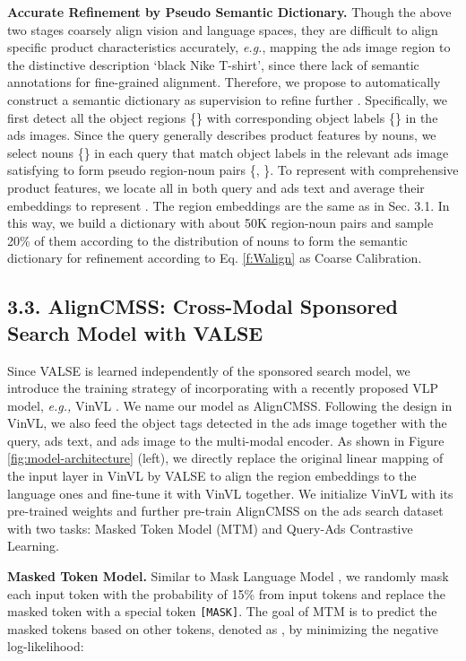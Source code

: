 \documentclass[letterpaper]{article} \usepackage{aaai24}  \usepackage{times}  \usepackage{helvet}  \usepackage{courier}  \usepackage[hyphens]{url}  \usepackage{graphicx} \urlstyle{rm} \def\UrlFont{\rm}  \usepackage{natbib}  \usepackage{caption} \frenchspacing  \setlength{\pdfpagewidth}{8.5in}  \setlength{\pdfpageheight}{11in}
\begin{document}
\noindent\textbf{Accurate Refinement by Pseudo Semantic Dictionary.} 
Though the above two stages coarsely align vision and language spaces, they are difficult to align specific product characteristics accurately, \textit{e.g.}, mapping the ads image region to the distinctive description `black Nike T-shirt', since there lack of semantic annotations for fine-grained alignment. Therefore, we propose to automatically construct a semantic dictionary as supervision to refine further . Specifically, we first detect all the object regions \{\} with corresponding object labels \{\} in the ads images. Since the query generally describes product features by nouns, we select nouns \{\} in each query that match object labels in the relevant ads image satisfying  to form pseudo region-noun pairs \{, \}. To represent  with comprehensive product features, we locate all  in both query and ads text and average their embeddings to represent . The region embeddings are the same as in Sec. 3.1. In this way, we build a dictionary with about 50K region-noun pairs and sample 20\% of them according to the distribution of nouns to form the semantic dictionary for refinement according to Eq. \ref{f:Walign} as Coarse Calibration.  

\subsection{3.3. AlignCMSS: Cross-Modal Sponsored Search Model with VALSE}
\label{ssec:search model}
Since VALSE is learned independently of the sponsored search model, we introduce the training strategy of incorporating  with a recently proposed VLP model, \textit{e.g.,} VinVL \cite{zhang2021vinvl}. We name our model as AlignCMSS. Following the design in VinVL, we also feed the object tags detected in the ads image together with the query, ads text, and ads image to the multi-modal encoder. As shown in Figure \ref{fig:model-architecture} (left), we directly replace the original linear mapping of the input layer in VinVL by VALSE to align the region embeddings to the language ones and fine-tune it with VinVL together. We initialize VinVL with its pre-trained weights and further pre-train AlignCMSS on the ads search dataset with two tasks: Masked Token Model (MTM) and Query-Ads Contrastive Learning.   

\noindent\textbf{Masked Token Model.} Similar to Mask Language Model \cite{devlin2019bert}, we randomly mask each input token  with the probability of 15\% from  input tokens and replace the masked token with a special token \texttt{[MASK]}. 
The goal of MTM is to predict the masked tokens based on other tokens, denoted as , by minimizing the negative log-likelihood:
\end{document}
